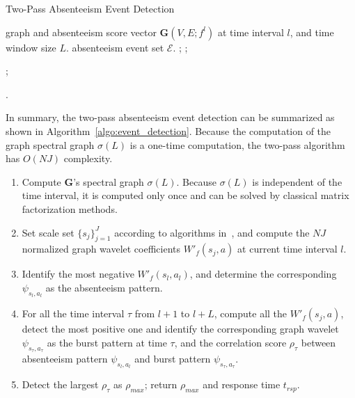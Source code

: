 \begin{algorithm}[t]
\centering
\captionsetup{font=scriptsize}
\caption{Two-Pass Absenteeism Event Detection}
{\footnotesize \begin{algorithmic}[1]
 graph and absenteeism score vector $\mathbf{G}(V,E;f^l)$ at time interval $l$, and time window size $L$.
 absenteeism event set $\mathcal{E}$.	
;
		    	    ;
		
		    	    ;
		    	    		
		    	    	    	\ENDIF

                   \ENDFOR

	            \ENDFOR	
		


.
\end{algorithmic}}
\label{algo:event_detection}
\end{algorithm}
In summary, the two-pass absenteeism event detection can be summarized as shown in Algorithm~\ref{algo:event_detection}. Because the computation of the graph spectral graph $\sigma(L)$ is a one-time computation, the two-pass algorithm has $O(NJ)$ complexity.
\begin{enumerate}
\item Compute $\mathbf{G}$'s spectral graph $\sigma(L)$. Because $\sigma(L)$ is independent of the time interval, it is computed only once and can be solved by classical matrix factorization methods.
\item Set scale set $\{s_j\}_{j=1}^J$ according to algorithms in~\cite{hammond2011wavelets}, and compute the $NJ$ normalized graph wavelet coefficients $W'_f(s_j, a)$ at current time interval $l$.
\item Identify the most negative $W'_f(s_l, a_l)$, and determine the corresponding $\psi_{s_l,a_l}$ as the absenteeism pattern.
\item For all the time interval $\tau$ from $l+1$ to $l+L$, compute all the $W'_f(s_j, a)$, detect the most positive one and identify the corresponding graph wavelet $\psi_{s_\tau,a_\tau}$ as the burst pattern at time $\tau$, and the correlation score $\rho_{\tau}$ between absenteeism pattern $\psi_{s_l,a_l}$ and burst pattern $\psi_{s_\tau,a_\tau}$.
\item Detect the largest $\rho_{\tau}$ as $\rho_{max}$; return $\rho_{max}$ and response time $t_{rsp}$.
\end{enumerate}


